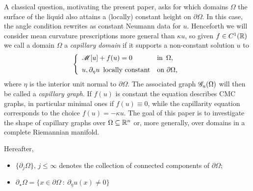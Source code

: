 \documentclass[10 pt,a4paper]{article}
\theoremstyle{definition}
\begin{document}
A classical question, motivating the present paper, asks for which domains $\Omega$ the surface of the liquid also attains a (locally) constant height on $\partial \Omega$. In this case, the angle condition rewrites as constant Neumann data for $u$. Henceforth we will consider mean curvature prescriptions more general than $\kappa u$, so given $f \in C^1(\mathbb R)$ we call a domain $\Omega$ a \emph{capillary domain} if it supports a non-constant solution $u$ to 
\begin{equation}\label{eq_PMC}
	\left\{ \begin{array}{ll}
		\mathscr{M}[u]  + f(u) = 0 & \text{in } \, \Omega, \\[0.2cm]
		u, \partial_\eta u \, \text{ locally constant} & \text{on $\partial \Omega$,} 
	\end{array}\right.
\end{equation}
where $\eta$ is the interior unit normal to $\partial \Omega$. The associated graph  $\mathscr{G}_u(\Omega)$ will then be called a \emph{capillary graph}. If $f(u)$ is constant  the equation describes CMC graphs, in particular minimal ones if $f(u) \equiv 0$, while the capillarity equation corresponds to the choice $f(u) = -\kappa u$. The goal of this paper is to investigate the shape of capillary graphs over $\Omega \subseteq \mathbb R^n$ or, more generally, over domains in a complete Riemannian manifold.

Hereafter, 
\begin{itemize}
\item $\{\partial_j\Omega\}$, $j \le \infty$ denotes  the collection of connected components of $\partial \Omega$;
\item $\partial_\star \Omega = \big\{ x \in \partial \Omega \ : \ \partial_\eta u(x) \neq 0\big\}$ 
\end{itemize}
\end{document}
